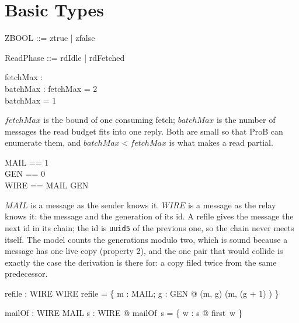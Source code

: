 \documentclass[a4paper,10pt,fleqn]{article}
\begin{document}
\section{Basic Types}

\begin{zed}
  ZBOOL ::= ztrue | zfalse
\end{zed}

\begin{zed}
  ReadPhase ::= rdIdle | rdFetched
\end{zed}

\begin{axdef}
  fetchMax : \nat \\
  batchMax : \nat
  \where
  fetchMax = 2 \\
  batchMax = 1
\end{axdef}

$fetchMax$ is the bound of one consuming fetch; $batchMax$ is the number of
messages the read budget fits into one reply.  Both are small so that
ProB can enumerate them, and $batchMax < fetchMax$ is what makes a read
partial.

\begin{zed}
  MAIL == 1  \\
  GEN == 0  \\
  WIRE == MAIL \cross GEN
\end{zed}

$MAIL$ is a message as the sender knows it.  $WIRE$ is a message as the relay
knows it: the message and the generation of its id.  A refile gives the
message the next id in its chain; the id is \texttt{uuid5} of the previous
one, so the chain never meets itself.  The model counts the generations
modulo two, which is sound because a message has one live copy (property 2),
and the one pair that would collide is exactly the case the derivation is
there for: a copy filed twice from the same predecessor.

\begin{axdef}
  refile : WIRE \fun WIRE
  \where
  refile = \{ m : MAIL; g : GEN @ (m, g) \mapsto (m, (g + 1) ) \}
\end{axdef}

\begin{axdef}
  mailOf : \power WIRE \fun \power MAIL
  \where
  \forall s : \power WIRE @ mailOf~s = \{ w : s @ first~w \}
\end{axdef}
\end{document}
